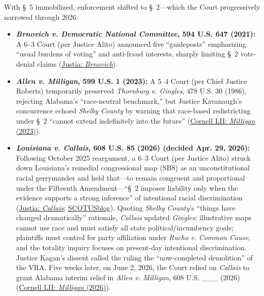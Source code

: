 \documentclass[12pt]{article}
\begin{document}
With \S~5 immobilized, enforcement shifted to \S~2---which the Court progressively narrowed through 2026:
\begin{itemize}
    \item \textbf{\emph{Brnovich v. Democratic National Committee}, 594 U.S. 647 (2021):} A 6--3 Court (per Justice Alito) announced five ``guideposts'' emphasizing ``usual burdens of voting'' and anti-fraud interests, sharply limiting \S~2 vote-denial claims (\href{https://supreme.justia.com/cases/federal/us/594/19-1257/}{Justia: \emph{Brnovich}}).
    \item \textbf{\emph{Allen v. Milligan}, 599 U.S. 1 (2023):} A 5--4 Court (per Chief Justice Roberts) temporarily preserved \emph{Thornburg v. Gingles}, 478 U.S. 30 (1986), rejecting Alabama's ``race-neutral benchmark,'' but Justice Kavanaugh's concurrence echoed \emph{Shelby County} by warning that race-based redistricting under \S~2 ``cannot extend indefinitely into the future'' (\href{https://www.law.cornell.edu/supremecourt/text/21-1086}{Cornell LII: \emph{Milligan} (2023)}).
    \item \textbf{\emph{Louisiana v. Callais}, 608 U.S. 85 (2026) (decided Apr. 29, 2026):} Following October 2025 reargument, a 6--3 Court (per Justice Alito) struck down Louisiana's remedial congressional map (SB8) as an unconstitutional racial gerrymander and held that---to remain congruent and proportional under the Fifteenth Amendment---``\S~2 imposes liability only when the evidence supports a strong inference'' of intentional racial discrimination (\href{https://supreme.justia.com/cases/federal/us/608/24-109/}{Justia: \emph{Callais}}; \href{https://www.scotusblog.com/2026/04/in-major-voting-rights-act-case-supreme-court-strikes-down-redistricting-map-challenged-as-racia/}{SCOTUSblog}). Quoting \emph{Shelby County}'s ``things have changed dramatically'' rationale, \emph{Callais} updated \emph{Gingles}: illustrative maps cannot use race and must satisfy all state political/incumbency goals; plaintiffs must control for party affiliation under \emph{Rucho v. Common Cause}; and the totality inquiry focuses on present-day intentional discrimination. Justice Kagan's dissent called the ruling the ``now-completed demolition'' of the VRA. Five weeks later, on June 2, 2026, the Court relied on \emph{Callais} to grant Alabama interim relief in \emph{Allen v. Milligan}, 608 U.S. \_\_\_ (2026) (\href{https://www.law.cornell.edu/supremecourt/text/25A1314}{Cornell LII: \emph{Milligan} (2026)}).
\end{itemize}
\end{document}
